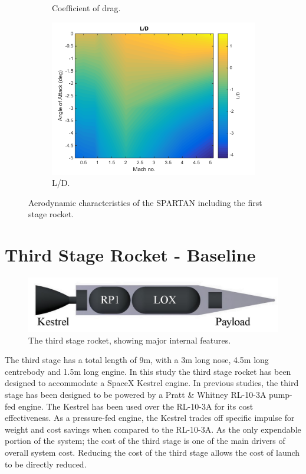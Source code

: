 \begin{figure}
\begin{subfigure}{.5\textwidth}
		\caption{Coefficient of drag.}
		\label{fig:Cd-FirstStage}
	\end{subfigure}
	\begin{subfigure}{.5\textwidth}
		\centering
		\includegraphics[width=0.99\linewidth]{figures/3_vehicle_design/FirstStageLD}
		\caption{L/D.}
		\label{fig:LD-EFirstStage}
	\end{subfigure}
	\caption{Aerodynamic characteristics of the SPARTAN including the first stage rocket.}
	\label{fig:FirstStageAero}
\end{figure}


	

	\section{Third Stage Rocket - Baseline}\label{sec:ThirdStageBaseline}
	
	\begin{figure}
\centering
\includegraphics[width=0.7\linewidth]{figures/3_vehicle_design/3rdStage}
\caption{The third stage rocket, showing major internal features.}
\label{fig:3rdStage}
\end{figure}
	
	
	The third stage has a total length of 9m, with a 3m long nose, 4.5m long centrebody and 1.5m long engine.
	In this study the third stage rocket has been designed to accommodate a SpaceX Kestrel engine. In previous studies, the third stage has been designed to be powered by a Pratt \& Whitney RL-10-3A pump-fed engine. The Kestrel has been used over the RL-10-3A for its cost effectiveness. As a pressure-fed engine, the Kestrel trades off specific impulse for weight and cost savings when compared to the RL-10-3A. As the only expendable portion of the system; the cost of the third stage is one of the main drivers of overall system cost. Reducing the cost of the third stage allows the cost of launch to be directly reduced. 
	
